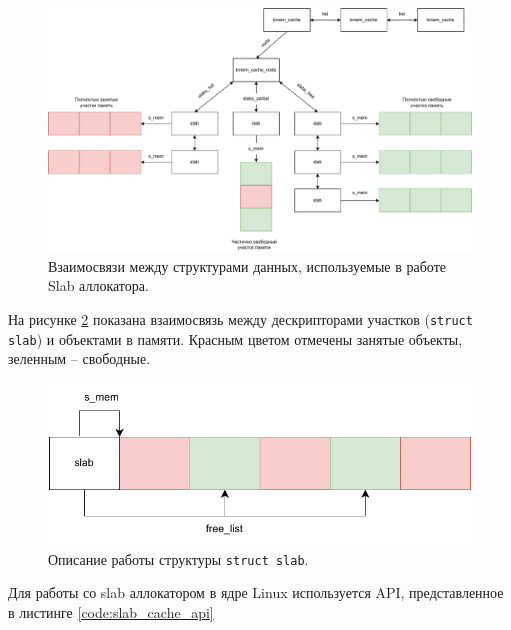 \begin{figure}[h]
	\centering
	\includegraphics[width=\textwidth]{img/kmem_cache.pdf}
	\caption{Взаимосвязи между структурами данных, используемые в работе Slab аллокатора.}
	\label{fig:kmem_cache}
\end{figure}

На рисунке \ref{fig:cache_objects} показана взаимосвязь между дескрипторами участков (\texttt{struct slab}) и объектами в памяти. Красным цветом отмечены занятые объекты, зеленным -- свободные.

\begin{figure}[h]
	\centering
	\includegraphics[width=\textwidth]{img/kmem_cache_2.pdf}
	\caption{Описание работы структуры \texttt{struct slab}.}
	\label{fig:cache_objects}
\end{figure}

Для работы со slab аллокатором в ядре Linux используется API, представленное в листинге \ref{code:slab_cache_api}



